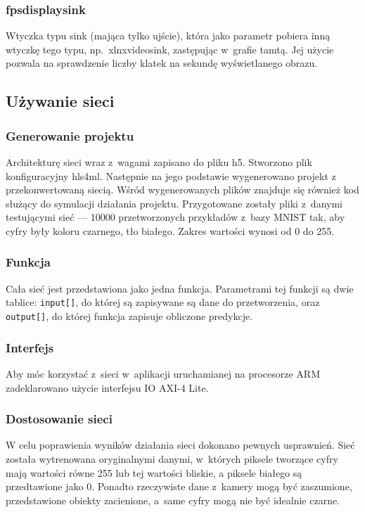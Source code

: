 \documentclass[12pt, oneside, a4paper]{article}
\begin{document}
\subsubsection{fpsdisplaysink}
Wtyczka typu sink (mająca tylko ujście), która jako parametr
pobiera inną wtyczkę tego typu, np.~xlnxvideosink,
zastępując w~grafie tamtą.
Jej użycie pozwala na sprawdzenie liczby klatek na sekundę
wyświetlanego obrazu.



\subsection{Używanie sieci}
\subsubsection{Generowanie projektu}
Architekturę sieci wraz z~wagami zapisano do pliku h5. Stworzono
plik konfiguracyjny hls4ml. Następnie na jego podstawie wygenerowano projekt
z przekonwertowaną siecią. Wśród wygenerowanych plików znajduje się
również kod służący do symulacji działania projektu. Przygotowane zostały
pliki z~danymi testującymi sieć --- 10000 przetworzonych przykładów z~bazy
MNIST tak, aby cyfry były koloru czarnego, tło białego. Zakres wartości
wynosi od 0 do 255.

\subsubsection{Funkcja}
Cała sieć jest przedstawiona jako jedna funkcja.
Parametrami tej funkcji są dwie tablice:
\lstinline[style=hls]{input[]}, do której są zapisywane są
dane do przetworzenia,
oraz \lstinline[style=hls]{output[]}, do której funkcja zapisuje
obliczone predykcje.

\begin{minipage}{\linewidth}

\end{minipage}

\subsubsection{Interfejs}
Aby móc korzystać z~sieci w~aplikacji uruchamianej na procesorze ARM
zadeklarowano użycie interfejsu IO \mbox{AXI-4} Lite.

\subsubsection{Dostosowanie sieci}
W celu poprawienia wyników działania sieci dokonano pewnych usprawnień.
Sieć została wytrenowana oryginalnymi danymi, w~których piksele tworzące
cyfry mają wartości równe 255 lub tej wartości bliskie,
a piksele białego są przedtawione jako 0.
Ponadto rzeczywiste dane z~kamery mogą być zaszumione,
przedstawione obiekty zacienione, a~same cyfry mogą nie być idealnie czarne.
\end{document}
